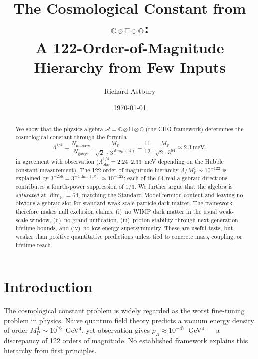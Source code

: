 \documentclass[12pt,a4paper]{article}
\title{The Cosmological Constant from $\Comp\otimes\Quat\otimes\Oct$:\\
A 122-Order-of-Magnitude Hierarchy from Few Inputs}
\author{Richard Astbury}
\date{\today}
\theoremstyle{definition}
\theoremstyle{remark}
\newcommand{\Oct}{\mathbb{O}}
\newcommand{\Quat}{\mathbb{H}}
\newcommand{\Comp}{\mathbb{C}}
\newcommand{\Real}{\mathbb{R}}
\newcommand{\Alg}{\mathcal{A}}
\newcommand{\MP}{M_{\mathrm{P}}}
\begin{document}
\maketitle

\begin{abstract}
We show that the physics algebra $\Alg = \Comp \otimes \Quat \otimes \Oct$ 
(the CHO framework) determines the cosmological constant through the formula
\begin{equation*}
\Lambda^{1/4} = \frac{N_{\mathrm{massive}}}{N_{\mathrm{gauge}}} 
\cdot \frac{\MP}{\sqrt{2}\,\cdot\, 3^{\dim_\Real(\Alg)}}
= \frac{11}{12}\cdot\frac{\MP}{\sqrt{2}\cdot 3^{64}}
\approx 2.3~\text{meV},
\end{equation*}
in agreement with observation ($\Lambda^{1/4}_{\mathrm{obs}} = 2.24$--$2.33$~meV 
depending on the Hubble constant measurement). The 122-order-of-magnitude 
hierarchy $\Lambda/\MP^4 \sim 10^{-122}$ is explained by 
$3^{-256} = 3^{-4\dim(\Alg)} \approx 10^{-122}$: each of the 64 real 
algebraic directions contributes a fourth-power suppression of $1/3$. 
We further argue that the algebra is \emph{saturated} at $\dim_\Real = 64$, 
matching the Standard Model fermion content and leaving no obvious algebraic 
slot for standard weak-scale particle dark matter. The framework therefore 
makes null exclusion claims: (i)~no WIMP dark matter in the usual weak-scale 
window, (ii)~no grand unification, (iii)~proton stability through next-generation 
lifetime bounds, and (iv)~no low-energy supersymmetry. These are useful tests, 
but weaker than positive quantitative predictions unless tied to concrete 
mass, coupling, or lifetime reach.
\end{abstract}

\tableofcontents

\section{Introduction}

The cosmological constant problem is widely regarded as the worst 
fine-tuning problem in physics. Naive quantum field theory predicts a 
vacuum energy density of order $\MP^4 \sim 10^{76}$~GeV$^4$, yet 
observation gives $\rho_\Lambda \approx 10^{-47}$~GeV$^4$ --- a 
discrepancy of 122 orders of magnitude. No established framework explains 
this hierarchy from first principles.
\end{document}
